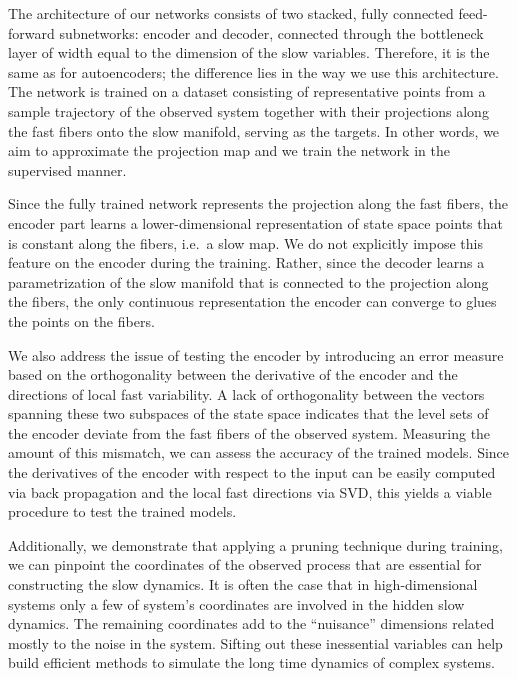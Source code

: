 \documentclass{article}
\begin{document}
The architecture of our networks consists of two stacked, fully connected feed-forward subnetworks: encoder and decoder, connected through the bottleneck layer of width equal to the dimension of the slow variables. Therefore, it is the same as for autoencoders; the difference lies in the way we use this architecture. The network is trained on a dataset consisting of representative points from a sample trajectory of the observed system together with their projections along the fast fibers onto the slow manifold, serving as the targets. In other words, we aim to approximate the projection map and we train the network in the supervised manner. 

Since the fully trained network represents the projection along the fast fibers, the encoder part learns a lower-dimensional representation of state space points that is constant along the fibers, i.e.~a slow map. We do not explicitly impose this feature on the encoder during the training. Rather, since the decoder learns a parametrization of the slow manifold that is connected to the projection along the fibers, the only continuous representation the encoder can converge to glues the points on the fibers.

We also address the issue of testing the encoder by introducing an error measure based on the orthogonality between the derivative of the encoder and the directions of local fast variability. A lack of orthogonality between the vectors spanning these two subspaces of the state space indicates that the level sets of the encoder deviate from the fast fibers of the observed system. Measuring the amount of this mismatch, we can assess the accuracy of the trained models. Since the derivatives of the encoder with respect to the input can be easily computed via back propagation and the local fast directions via SVD, this yields a viable procedure to test the trained models.

Additionally, we demonstrate that applying a pruning technique during training, we can pinpoint the coordinates of the observed process that are essential for constructing the slow dynamics. It is often the case that in high-dimensional systems only a few of system's coordinates are involved in the hidden slow dynamics. The remaining coordinates add to the ``nuisance'' dimensions related mostly to the noise in the system. Sifting out these inessential variables can help build efficient methods to simulate the long time dynamics of complex systems.
\end{document}
